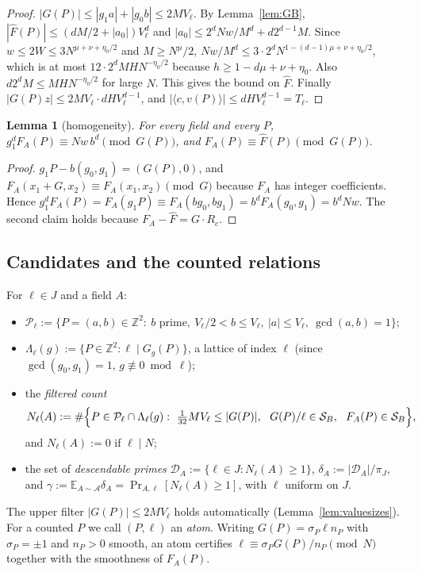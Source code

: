 \documentclass[11pt]{amsart}
\newtheorem{lemma}[theorem]{Lemma}
\theoremstyle{definition}
\newcommand{\Z}{\mathbb{Z}}
\newcommand{\cA}{\mathcal{A}}
\newcommand{\cD}{\mathcal{D}}
\newcommand{\cP}{\mathcal{P}}
\newcommand{\cS}{\mathcal{S}}
\newcommand{\Ex}{\mathbb{E}}
\newcommand{\Prob}{\Pr}
\begin{document}
\begin{proof}
$|G(P)|\le|g_1a|+|g_0b|\le2MV_\ell$. By Lemma~\ref{lem:GB}, $|\hat F(P)|\le(dM/2+|a_0|)V_\ell^d$ and
$|a_0|\le2^dNw/M^d+d2^{d-1}M$. Since $w\le2W\le3N^{\mu+\nu+\eta_0/2}$ and $M\ge N^\mu/2$,
$Nw/M^d\le3\cdot2^dN^{1-(d-1)\mu+\nu+\eta_0/2}$, which is at most $12\cdot2^dMHN^{-\eta_0/2}$ because
$h\ge1-d\mu+\nu+\eta_0$. Also $d2^dM\le MHN^{-\eta_0/2}$ for large $N$. This gives the bound on $\hat F$. Finally
$|G(P)z|\le2MV_\ell\cdot dHV_\ell^{d-1}$, and $|\langle c,v(P)\rangle|\le dHV_\ell^{d-1}=T_\ell$.
\end{proof}

\begin{lemma}[homogeneity]\label{lem:homog}
For every field and every $P$, $g_1^dF_A(P)\equiv Nw\,b^d\pmod{G(P)}$, and $F_A(P)\equiv\hat F(P)\pmod{G(P)}$.
\end{lemma}

\begin{proof}
$g_1P-b(g_0,g_1)=(G(P),0)$, and $F_A(x_1+G,x_2)\equiv F_A(x_1,x_2)\pmod G$ because $F_A$ has integer
coefficients. Hence $g_1^dF_A(P)=F_A(g_1P)\equiv F_A(bg_0,bg_1)=b^dF_A(g_0,g_1)=b^dNw$. The second claim holds because
$F_A-\hat F=G\cdot R_c$.
\end{proof}

\subsection{Candidates and the counted relations}\label{sec:candidates}
For $\ell\in J$ and a field $A$:
\begin{itemize}
\item $\cP_\ell:=\{P=(a,b)\in\Z^2:\ b\text{ prime},\ V_\ell/2<b\le V_\ell,\ |a|\le V_\ell,\ \gcd(a,b)=1\}$;
\item $\Lambda_\ell(g):=\{P\in\Z^2:\ell\mid G_g(P)\}$, a lattice of index $\ell$ (since $\gcd(g_0,g_1)=1$, $g\not\equiv0\bmod\ell$);
\item the \emph{filtered count}
\[
N_\ell(A):=\#\Bigl\{P\in\cP_\ell\cap\Lambda_\ell(g):\ \tfrac{1}{32}MV_\ell\le|G(P)|,\ \ G(P)/\ell\in\cS_B,\ \ F_A(P)\in\cS_B\Bigr\},
\]
  and $N_\ell(A):=0$ if $\ell\mid N$;
\item the set of \emph{descendable primes} $\cD_A:=\{\ell\in J:N_\ell(A)\ge1\}$, $\delta_A:=|\cD_A|/\pi_J$, and
  $\gamma:=\Ex_{A\sim\cA}\delta_A=\Prob_{A,\ell}[N_\ell(A)\ge1]$, with $\ell$ uniform on $J$.
\end{itemize}
The upper filter $|G(P)|\le2MV_\ell$ holds automatically (Lemma~\ref{lem:valuesizes}). For a counted
$P$ we call $(P,\ell)$ an \emph{atom}. Writing $G(P)=\sigma_P\ell n_P$ with $\sigma_P=\pm1$ and $n_P>0$ smooth,
an atom certifies $\ell\equiv\sigma_PG(P)/n_P\pmod N$ together with the smoothness of $F_A(P)$.
\end{document}
